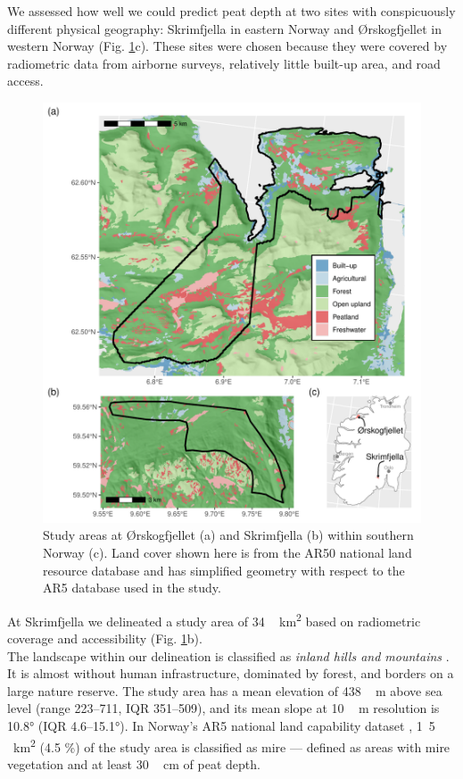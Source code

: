 \documentclass[soil, manuscript]{copernicus}
\begin{document}
We assessed how well we could predict peat depth at two sites with conspicuously different physical geography: Skrimfjella in eastern Norway and Ørskogfjellet in western Norway (Fig. \ref{fig:sites}c).
These sites were chosen because they were covered by radiometric data from airborne surveys, relatively little built-up area, and road access.

\begin{figure}
\includegraphics[height=0.9\textheight]{figures/sites-patchwork} \caption{Study areas at Ørskogfjellet (a) and Skrimfjella (b) within southern Norway (c). Land cover shown here is from the AR50 national land resource database and has simplified geometry with respect to the AR5 database used in the study.}\label{fig:sites}
\end{figure}

At Skrimfjella we delineated a study area of \unit{34\,km^{2}} based on radiometric coverage and accessibility (Fig. \ref{fig:sites}b).\\
The landscape within our delineation is classified as \emph{inland hills and mountains} \citep{simensenDiversityDistributionLandscape2021}.
It is almost without human infrastructure, dominated by forest, and borders on a large nature reserve.
The study area has a mean elevation of \unit{438\,m} above sea level (range 223--711, IQR 351--509), and its mean slope at \unit{10\,m} resolution is 10.8° (IQR 4.6--15.1°).
In Norway's AR5 national land capability dataset \citep{ahlstromAR5Klassifikasjonssystem2019}, \unit{1.5\,km^{2}} (4.5 \%) of the study area is classified as mire --- defined as areas with mire vegetation and at least \unit{30\,cm} of peat depth.
\end{document}
